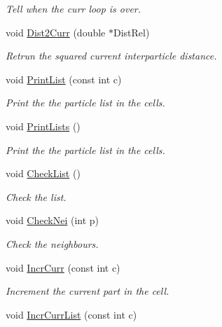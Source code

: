 \begin{DoxyCompactItemize}
\begin{DoxyCompactList}\small\item\em Tell when the curr loop is over. \end{DoxyCompactList}\item 
void \hyperlink{classDdDoubleLoop_ad4860e7b4a26d4b424e5c98b7c6bae09}{Dist2\+Curr} (double $\ast$Dist\+Rel)
\begin{DoxyCompactList}\small\item\em Retrun the squared current interparticle distance. \end{DoxyCompactList}\item 
void \hyperlink{classDdDoubleLoop_abacbda4ce7eed0eee33efe489157ff81}{Print\+List} (const int c)\hypertarget{classDdDoubleLoop_abacbda4ce7eed0eee33efe489157ff81}{}\label{classDdDoubleLoop_abacbda4ce7eed0eee33efe489157ff81}

\begin{DoxyCompactList}\small\item\em Print the the particle list in the cells. \end{DoxyCompactList}\item 
void \hyperlink{classDdDoubleLoop_aff89725be8d743f07f318ef0c06858e1}{Print\+Lists} ()\hypertarget{classDdDoubleLoop_aff89725be8d743f07f318ef0c06858e1}{}\label{classDdDoubleLoop_aff89725be8d743f07f318ef0c06858e1}

\begin{DoxyCompactList}\small\item\em Print the the particle list in the cells. \end{DoxyCompactList}\item 
void \hyperlink{classDdDoubleLoop_a4e589206ab9bc4752d547111d6bba6e7}{Check\+List} ()\hypertarget{classDdDoubleLoop_a4e589206ab9bc4752d547111d6bba6e7}{}\label{classDdDoubleLoop_a4e589206ab9bc4752d547111d6bba6e7}

\begin{DoxyCompactList}\small\item\em Check the list. \end{DoxyCompactList}\item 
void \hyperlink{classDdDoubleLoop_ad6d4b1b657a39ed64c2c45d4706dbcc1}{Check\+Nei} (int p)\hypertarget{classDdDoubleLoop_ad6d4b1b657a39ed64c2c45d4706dbcc1}{}\label{classDdDoubleLoop_ad6d4b1b657a39ed64c2c45d4706dbcc1}

\begin{DoxyCompactList}\small\item\em Check the neighbours. \end{DoxyCompactList}\item 
void \hyperlink{classDdDoubleLoop_ab61672aad0bc83dc07c8efd5a4543fc7}{Incr\+Curr} (const int c)
\begin{DoxyCompactList}\small\item\em Increment the current part in the cell. \end{DoxyCompactList}\item 
void \hyperlink{classDdDoubleLoop_a0c040f6773c460a8eb46bff752c08d2d}{Incr\+Curr\+List} (const int c)\hypertarget{classDdDoubleLoop_a0c040f6773c460a8eb46bff752c08d2d}{}\label{classDdDoubleLoop_a0c040f6773c460a8eb46bff752c08d2d}


\end{DoxyCompactItemize}
